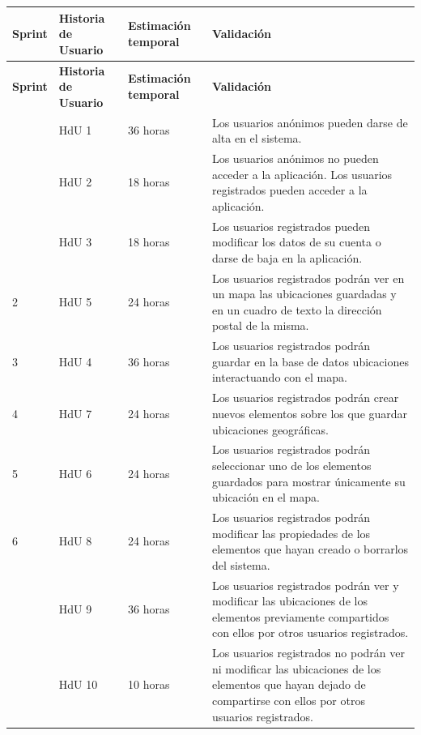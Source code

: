\begin{longtable}{p{1cm} p{4cm} p{4cm} p{6cm}}
  	\hline  	    
  	\multicolumn{1}{p{1cm}}{\cellcolor{black!30}\textbf{Sprint}} &
    \multicolumn{1}{p{4cm}}{\cellcolor{black!30}\textbf{Historia de Usuario}} & 
 	\multicolumn{1}{p{4cm}}{\cellcolor{black!30}\textbf{Estimación temporal}} &
 	\multicolumn{1}{p{6cm}}{\cellcolor{black!30}\textbf{Validación}}
 	\\
 	\toprule 
   	\endfirsthead
	     
    \hline
  	\multicolumn{1}{p{1cm}}{\cellcolor{black!30}\textbf{Sprint}} &
    \multicolumn{1}{p{4cm}}{\cellcolor{black!30}\textbf{Historia de Usuario}} & 
 	\multicolumn{1}{p{4cm}}{\cellcolor{black!30}\textbf{Estimación temporal}} &
 	\multicolumn{1}{p{6cm}}{\cellcolor{black!30}\textbf{Validación}}
 	\\	 
 	\toprule
 	\endhead

	\rowcolor{gray!25}
	\multirow{3}{*}{1}	& HdU 1	&	36 horas	&	Los usuarios anónimos pueden darse de alta en el sistema. \\ 
	\rowcolor{gray!25}	& HdU 2	&	18 horas	&	Los usuarios anónimos no pueden acceder a la aplicación. Los usuarios registrados 														pueden acceder a la aplicación. \\ 
	\rowcolor{gray!25}	& HdU 3	&	18 horas	&	Los usuarios registrados pueden modificar los datos de su cuenta o darse de baja en 														la aplicación.  \\                      
	
	2	& HdU 5		&	24 horas	&	Los usuarios registrados podrán ver en un mapa las ubicaciones guardadas y en un cuadro de 												texto la dirección postal de la misma.\\
	\rowcolor{gray!25}
	3	& HdU 4		&	36 horas	&	Los usuarios registrados podrán guardar en la base de datos ubicaciones 																	interactuando con el mapa. \\
	
	4	& HdU 7		&	24 horas	&	Los usuarios registrados podrán crear nuevos elementos sobre los que guardar ubicaciones 													geográficas. \\
	\rowcolor{gray!25}
	5	& HdU 6		&	24 horas	&	Los usuarios registrados podrán seleccionar uno de los elementos 																			guardados para mostrar únicamente su ubicación en el mapa. \\

	6	& HdU 8		&	24 horas	&	Los usuarios registrados podrán modificar las propiedades de los elementos que hayan creado o 											borrarlos del sistema. \\
	\rowcolor{gray!25}
	\multirow{2}{*}{7}	& HdU 9		&	36 horas	&	Los usuarios registrados podrán ver y modificar las ubicaciones de los elementos 															previamente compartidos con ellos por otros usuarios registrados. \\
	\rowcolor{gray!25}	& HdU 10	&	10 horas	&	Los usuarios registrados no podrán ver ni modificar las ubicaciones de los 																elementos que hayan dejado de compartirse con ellos por otros usuarios 																	registrados. \\


\end{longtable}
